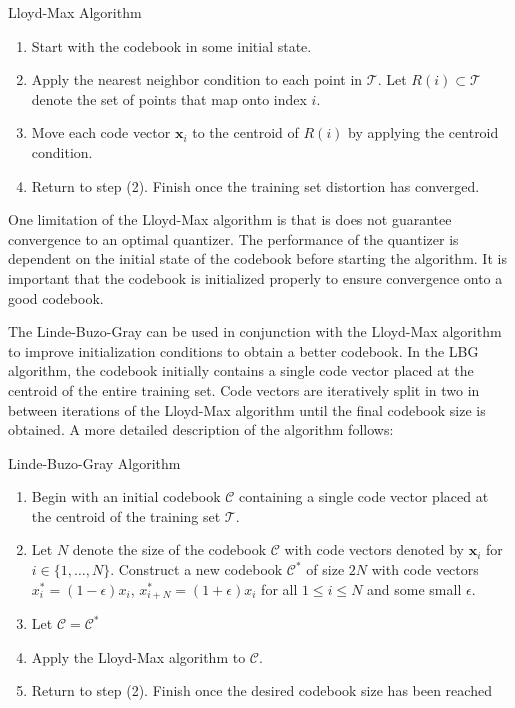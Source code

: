 \documentclass[10pt,twoside,titlepage]{article}
\newcommand{\bx}{\mathbf{x}}
\begin{document}
\medskip

{\noindent \sc Lloyd-Max Algorithm}
\begin{enumerate}
\item Start with the codebook in some initial state.
\item Apply the nearest neighbor condition to each point in $\mathcal{T}$. Let $R(i) \subset \mathcal{T}$ denote the set of points that map onto index $i$.
\item Move each code vector $\bx_i$ to the centroid of $R(i)$ by applying the centroid condition.
\item Return to step (2). Finish once the training set distortion has converged.
\end{enumerate}

One limitation of the Lloyd-Max algorithm is that is does not guarantee convergence to an optimal quantizer. The performance of the quantizer is dependent on the initial state of the codebook before starting the algorithm. It is important that the codebook is initialized properly to ensure convergence onto a good codebook.

The Linde-Buzo-Gray can be used in conjunction with the Lloyd-Max algorithm to improve initialization conditions to obtain a better codebook. In the LBG algorithm, the codebook initially contains a single code vector placed at the centroid of the entire training set. Code vectors are iteratively split in two in between iterations of the Lloyd-Max algorithm until the final codebook size is obtained. A more detailed description of the algorithm follows:

\medskip

{\sc \noindent Linde-Buzo-Gray Algorithm}
\begin{enumerate}
\item Begin with an initial codebook $\mathcal{C}$ containing a single code vector placed at the centroid of the training set $\mathcal{T}$.
\item Let $N$ denote the size of the codebook $\mathcal{C}$ with code vectors denoted by $\bx_i$ for $i \in \{1,\ldots,N\}$. Construct a new codebook $\mathcal{C}^*$ of size $2N$ with code vectors $x_i^* = (1-\epsilon)x_i$, $x_{i+N}^* = (1+\epsilon)x_i$ for all $1 \le i \le N$ and some small $\epsilon$.
\item Let $\mathcal{C}=\mathcal{C}^*$
\item Apply the Lloyd-Max algorithm to $\mathcal{C}$.
\item Return to step (2). Finish once the desired codebook size has been reached
\end{enumerate}
\end{document}

